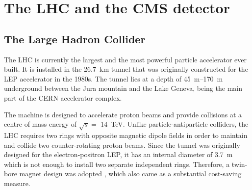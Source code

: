 \chapter{The LHC and the CMS detector}
\ifpdf
    \graphicspath{{03_Detector/plots/}}
\else
    \graphicspath{{03_Detector/plots/EPS/}{03_Detector/plots/}}
\fi

\section{The Large Hadron Collider}
The LHC \cite{LHC} is currently the largest and the most powerful particle accelerator ever built. It is installed in
the \SI{26.7}{\km} tunnel that was originally constructed for the LEP accelerator in the 1980s. The tunnel lies at a
depth of \SIrange{45}{170}{\metre} underground between the Jura mountain and the Lake Geneva, being the main part of the
CERN accelerator complex.

The machine is designed to accelerate proton beams and provide collisions at a centre of mass energy of $\sqrt s =$
\SI{14}{\TeV}. Unlike particle-antiparticle colliders, the LHC requires two rings with opposite magnetic dipole fields
in order to maintain and collide two counter-rotating proton beams. Since the tunnel was originally designed for the
electron-positron LEP, it has an internal diameter of \SI{3.7}{\metre} which is not enough to install two separate
independent rings. Therefore, a twin-bore magnet design was adopted \cite{Blewett}, which also came as a substantial
cost-saving measure.

